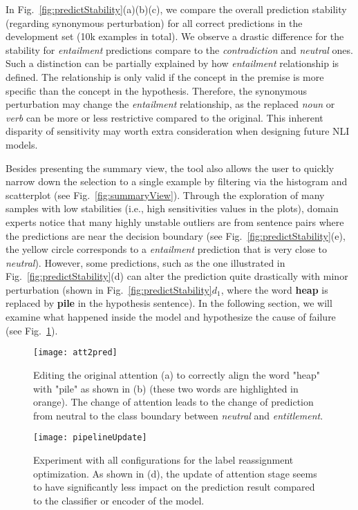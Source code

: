 In Fig.~\ref{fig:predictStability}(a)(b)(c), we compare the overall prediction stability (regarding synonymous perturbation) for all correct predictions in the development set (10k examples in total).
%
We observe a drastic difference for the stability for \emph{entailment} predictions compare to the \emph{contradiction} and \emph{neutral} ones.
%
Such a distinction can be partially explained by how \emph{entailment} relationship is defined. The relationship is only valid if the concept in the premise is more specific than the concept in the hypothesis. Therefore, the synonymous perturbation may change the \emph{entailment} relationship, as the replaced \emph{noun} or \emph{verb} can be more or less restrictive compared to the original.
This inherent disparity of sensitivity may worth extra consideration when designing future NLI models.

Besides presenting the summary view, the tool also allows the user to quickly narrow down the selection to a single example by filtering via the histogram and scatterplot (see Fig.~\ref{fig:summaryView}).
%
Through the exploration of many samples with low stabilities (i.e., high sensitivities values in the plots), domain experts notice that many highly unstable outliers are from sentence pairs where the predictions are near the decision boundary (see Fig.~\ref{fig:predictStability}(e), the yellow circle corresponds to a \emph{entailment} prediction that is very close to \emph{neutral}).
However, some predictions, such as the one illustrated in Fig.~\ref{fig:predictStability}(d) can alter the prediction quite drastically with minor perturbation (shown in Fig.~\ref{fig:predictStability}$d_1$, where the word \textbf{heap} is replaced by \textbf{pile} in the hypothesis sentence). In the following section, we will examine what happened inside the model and hypothesize the cause of failure (see Fig.~\ref{fig:att2pred}).

\begin{figure}[htbp]
\centering
\vspace{-2mm}
 \texttt{[image: att2pred]}
 \caption{
Editing the original attention (a) to correctly align the word "heap" with "pile" as shown in (b) (these two words are highlighted in orange).
The change of attention leads to the change of prediction from neutral to the class boundary between \emph{neutral} and \emph{entitlement}.
%
}
\label{fig:att2pred}
\end{figure}

\begin{figure*}[t]
\centering
\vspace{-2mm}
 \texttt{[image: pipelineUpdate]}
  \vspace{-6mm}
 \caption{
Experiment with all configurations for the label reassignment optimization. As shown in (d), the update of attention stage seems to have significantly less impact on the prediction result compared to the classifier or encoder of the model.
 }
  \vspace{-4mm}
\label{fig:pipelineUpdate}
\end{figure*}

